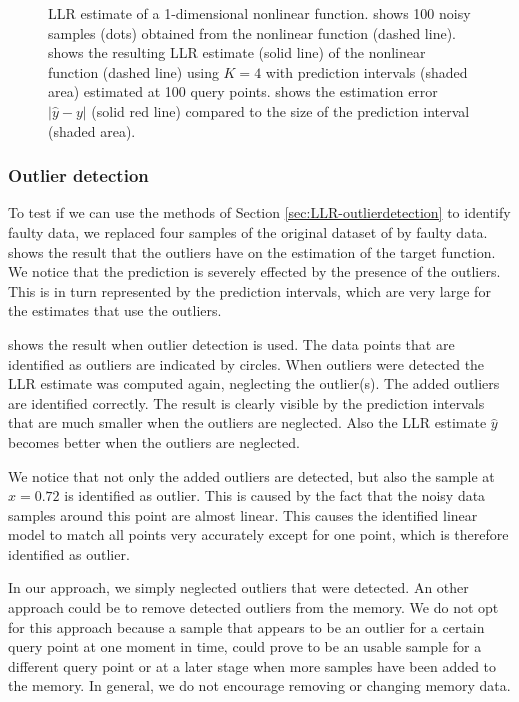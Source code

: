 \begin{figure}[htbp]
{	\label{fig:LLR-nonlinfunction_predint}
	}
	\caption[\acs{LLR} estimate of a nonlinear function]{\ac{LLR} estimate of a 1-dimensional nonlinear function.  shows 100 noisy samples (dots) obtained from the nonlinear function  (dashed line).  shows the resulting \ac{LLR} estimate (solid line) of the nonlinear function (dashed line) using $K=4$ with prediction intervals (shaded area) estimated at 100 query points.  shows the estimation error $\left| \hat{y} - y \right|$ (solid red line) compared to the size of the prediction interval (shaded area).}
	\label{fig:LLR-nonlinfunction}
\end{figure}


\subsubsection{Outlier detection}
To test if we can use the methods of Section \ref{sec:LLR-outlierdetection} to identify faulty data, we replaced four samples of the original dataset of  by faulty data.  shows the result that the outliers have on the estimation of the target function. We notice that the prediction is severely effected by the presence of the outliers. This is in turn represented by the prediction intervals, which are very large for the estimates that use the outliers.
 
 shows the result when outlier detection is used. The data points that are identified as outliers are indicated by circles. When outliers were detected the \ac{LLR} estimate was computed again, neglecting the outlier(s). The added outliers are identified correctly. The result is clearly visible by the prediction intervals that are much smaller when the outliers are neglected. Also the \ac{LLR} estimate $\hat{y}$ becomes better when the outliers are neglected.

We notice that not only the added outliers are detected, but also the sample at $x = 0.72$ is identified as outlier. This is caused by the fact that the noisy data samples around this point are almost linear. This causes the identified linear model to match all points very accurately except for one point, which is therefore identified as outlier.

In our approach, we simply neglected outliers that were detected. An other approach could be to remove detected outliers from the memory. We do not opt for this approach because a sample that appears to be an outlier for a certain query point at one moment in time, could prove to be an usable sample for a different query point or at a later stage when more samples have been added to the memory. In general, we do not encourage removing or changing memory data. 
 
